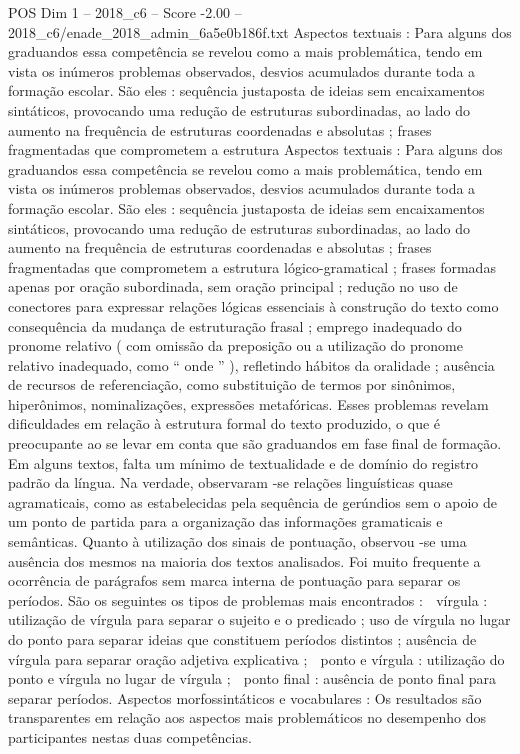 \begin{textsample}{POS Dim 1 – 2018\_c6 – Score -2.00 – 2018\_c6/enade\_2018\_admin\_6a5e0b186f.txt}
Aspectos textuais : Para alguns dos graduandos essa competência se revelou como a mais problemática, tendo em vista os inúmeros problemas observados, desvios acumulados durante toda a formação escolar.
São eles : sequência justaposta de ideias sem encaixamentos sintáticos, provocando uma redução de estruturas subordinadas, ao lado do aumento na frequência de estruturas coordenadas e absolutas ; frases fragmentadas que comprometem a estrutura Aspectos textuais : Para alguns dos graduandos essa competência se revelou como a mais problemática, tendo em vista os inúmeros problemas observados, desvios acumulados durante toda a formação escolar.
São eles : sequência justaposta de ideias sem encaixamentos sintáticos, provocando uma redução de estruturas subordinadas, ao lado do aumento na frequência de estruturas coordenadas e absolutas ; frases fragmentadas que comprometem a estrutura lógico-gramatical ; frases formadas apenas por oração subordinada, sem oração principal ; redução no uso de conectores para expressar relações lógicas essenciais à construção do texto como consequência da mudança de estruturação frasal ; emprego inadequado do pronome relativo ( com omissão da preposição ou a utilização do pronome relativo inadequado, como “ onde ” ), refletindo hábitos da oralidade ; ausência de recursos de referenciação, como substituição de termos por sinônimos, hiperônimos, nominalizações, expressões metafóricas.
Esses problemas revelam dificuldades em relação à estrutura formal do texto produzido, o que é preocupante ao se levar em conta que são graduandos em fase final de formação.
Em alguns textos, falta um mínimo de textualidade e de domínio do registro padrão da língua.
Na verdade, observaram -se relações linguísticas quase agramaticais, como as estabelecidas pela sequência de gerúndios sem o apoio de um ponto de partida para a organização das informações gramaticais e semânticas.
Quanto à utilização dos sinais de pontuação, observou -se uma ausência dos mesmos na maioria dos textos analisados.
Foi muito frequente a ocorrência de parágrafos sem marca interna de pontuação para separar os períodos.
São os seguintes os tipos de problemas mais encontrados :  vírgula : utilização de vírgula para separar o sujeito e o predicado ; uso de vírgula no lugar do ponto para separar ideias que constituem períodos distintos ; ausência de vírgula para separar oração adjetiva explicativa ;  ponto e vírgula : utilização do ponto e vírgula no lugar de vírgula ;  ponto final : ausência de ponto final para separar períodos.
Aspectos morfossintáticos e vocabulares : Os resultados são transparentes em relação aos aspectos mais problemáticos no desempenho dos participantes nestas duas competências.

\end{textsample}
